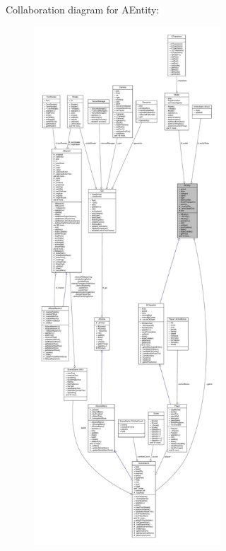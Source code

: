 Collaboration diagram for A\+Entity\+:
\nopagebreak
\begin{figure}[H]
\begin{center}
\leavevmode
\includegraphics[height=550pt]{class_a_entity__coll__graph}
\end{center}
\end{figure}
